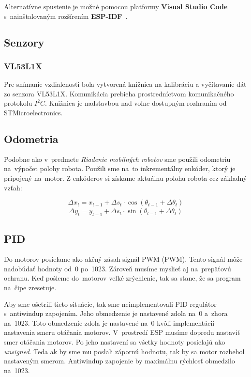 Alternatívne spustenie je možné pomocou platformy \textbf{Visual Studio Code} s~nainštalovaným rozšírením
\textbf{ESP-IDF}~\cite{espIDF}.

\subsection{Senzory}

\subsubsection{VL53L1X}
Pre snímanie vzdialenosti bola vytvorená knižnica na kalibráciu a vyčítavanie dát zo senzora VL53L1X. Komunikácia prebieha prostredníctvom komunikačného protokolu $I^2 C$. Knižnica je nadstavbou nad voľne dostupným rozhraním od STMicroelectronics.

\subsection{Odometria}
\label{subsec:odometria}

Podobne ako v~predmete \textit{Riadenie mobilných robotov} sme použili odometriu na~výpočet polohy robota.
Použili sme na~to inkrementálny enkóder, ktorý je pripojený na~motor. Z enkóderov si získame aktuálnu polohu robota
cez základný vzťah:

\begin{equation}
	\label{eq:odometria}
	 \Delta x_t = x_{t-1} + \Delta s_t \cdot \cos(\theta_{t-1} + \Delta \theta_t)
\end{equation}
\begin{align*}
	\Delta y_t = y_{t-1} + \Delta s_t \cdot \sin(\theta_{t-1} + \Delta \theta_t)
\end{align*}

\newpage

\subsection{PID}
\label{subsec:pid}

Do motorov posielame ako akčný zásah signál PWM (\acrlong{PWM}). Tento signál môže nadobúdať hodnoty od~0 po~1023.
Zároveň musíme myslieť aj na~prepäťovú ochranu. Keď pošleme do~motorov veľké zrýchlenie, tak sa stane, že sa program
na~čipe zresetuje.

Aby sme ošetrili tieto situácie, tak sme neimplementovali PID regulátor s~antiwindup zapojením. Jeho obmedzenie je
nastavené zdola na~0 a~zhora na~1023. Toto obmedzenie zdola je nastavené na~0 kvôli implementácii nastavenia smeru
otáčania motorov. V~prostredí ESP musíme dopredu nastaviť smer otáčania motorov. Po jeho nastavení sa všetky hodnoty
posielajú ako \textit{unsigned}. Teda ak by sme mu poslali zápornú hodnotu, tak by sa motor rozbehol nastaveným smerom.
Antiwindup zapojenie by maximálnu rýchlosť obmedzilo na~1023.

